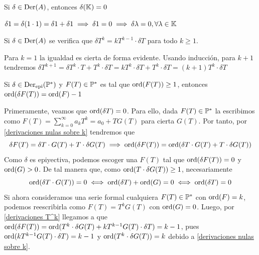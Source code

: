 \begin{proposicion}\label{derivaciones nulas sobre k}
    Si $\delta \in \operatorname*{Der}(A)$, entonces $\delta (\mathbb{K}) = 0$
\end{proposicion}

\begin{demo}
    $\delta 1 = \delta (1 \cdot 1) = \delta 1 + \delta 1 \implies \delta 1 = 0 \implies \delta \lambda = 0, \forall \lambda \in \mathbb{K}$
\end{demo}

\begin{proposicion}\label{derivaciones T^k}
    Si $\delta \in \operatorname*{Der}(A)$ se verifica que $\delta T^k = kT^{k-1} \cdot \delta T$ para todo $k \geq 1$.
\end{proposicion}

\begin{demo}
    Para $k = 1$ la igualdad es cierta de forma evidente. Usando inducción, para $k+1$ tendremos $\delta T^{k+1} = \delta T^k \cdot T + T^k \cdot \delta T =  k T^{k} \cdot \delta T + T^k \cdot \delta T = (k+1) T^k \cdot \delta T$ 
\end{demo}

\begin{teorema}
    Si $\delta \in \operatorname*{Der}_{\mathrm{epi}}(\mathbb{P}^*)$ y $F(T) \in \mathbb{P}^*$ es tal que $\operatorname*{ord}(F(T)) \geq 1$, entonces $\operatorname*{ord}(\delta F(T)) = \operatorname*{ord}(F)-1$
\end{teorema}

\begin{demo}
    Primeramente, veamos que $\operatorname*{ord}(\delta T) = 0$. Para ello, dada $F(T) \in \mathbb{P}^*$ la escribimos como $F(T) = \sum_{k=0}^\infty a_k T^k = a_0 + TG(T)$ para cierta $G(T)$. Por tanto, por \ref{derivaciones nulas sobre k} tendremos que
    \begin{equation*}
        \delta F(T) = \delta T \cdot G(T) + T \cdot \delta G(T) \implies \operatorname*{ord}(\delta F(T)) = \operatorname*{ord}(\delta T \cdot G(T) + T \cdot \delta G(T))
    \end{equation*}
    Como $\delta$ es epiyectiva, podemos escoger una $F(T)$ tal que $\operatorname*{ord}(\delta F(T)) = 0$ y $\operatorname*{ord}(G) > 0$. De tal manera que, como $\operatorname*{ord}(T \cdot \delta G(T)) \geq 1$, necesariamente
    \begin{equation*}
        \operatorname*{ord}(\delta T \cdot G(T)) = 0 \iff \operatorname*{ord}(\delta T) + \operatorname*{ord} (G) = 0 \iff \operatorname*{ord}(\delta T) = 0
    \end{equation*}
    Si ahora consideramos una serie formal cualquiera $F(T) \in \mathbb{P}^*$ con $\operatorname*{ord}(F) = k$, podemos reescribirla como $F(T) = T^k G(T)$ con $\operatorname*{ord}(G) = 0$. Luego, por \ref{derivaciones T^k} llegamos a que $\operatorname*{ord}(\delta F(T)) = \operatorname*{ord}(T^k \cdot \delta G(T) + kT^{k-1}G(T) \cdot \delta T) = k-1$, pues $\operatorname*{ord}(kT^{k-1}G(T) \cdot \delta T) = k-1$ y $\operatorname*{ord}(T^k \cdot \delta G(T)) = k$ debido a \ref{derivaciones nulas sobre k}.
\end{demo}

